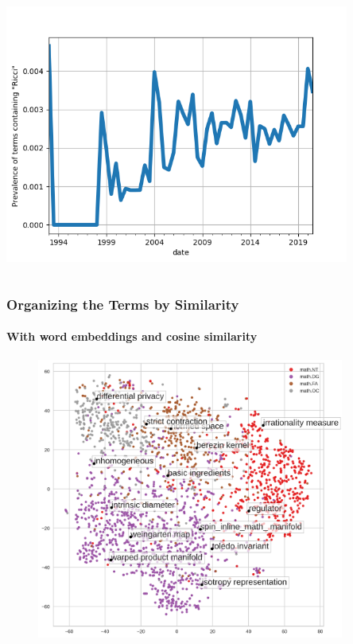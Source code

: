 \documentclass[10pt]{beamer}
\begin{document}
\begin{frame}
\begin{columns}
\begin{column}{0.6\textwidth}
\begin{center}
                \includegraphics[width=0.85\textwidth]{../Images/ricci_preval.png}
            \end{center}
        \end{column}
    \end{columns}
\end{frame}



\begin{frame}
    \frametitle{Organizing the Terms by Similarity}
    \framesubtitle{With word embeddings and cosine similarity}
            \begin{figure}
                \centering
                \includegraphics[width=0.9\textwidth]{../Images/scatter_option5.png}
            \end{figure}
\end{frame}
\end{document}
